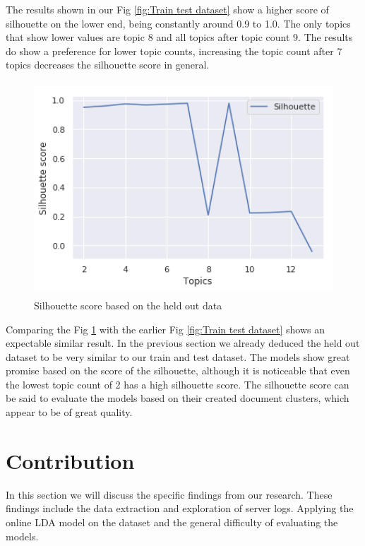 The results shown in our Fig \ref{fig:Train test dataset} show a higher score of silhouette on the lower end, being constantly around 0.9 to 1.0. The only topics that show lower values are topic 8 and all topics after topic count 9. The results do show a preference for lower topic counts, increasing the topic count after 7 topics decreases the silhouette score in general. 

\begin{figure}[h]
    \centering
    \includegraphics[width=15cm, height=8cm]{figures/silhouette_values_topics_held_out.png}
    \caption{Silhouette score based on the held out data}
    \label{fig:Held out}
\end{figure}

Comparing the Fig \ref{fig:Held out} with the earlier Fig \ref{fig:Train test dataset} shows an expectable similar result. In the previous section we already deduced the held out dataset to be very similar to our train and test dataset. The models show great promise based on the score of the silhouette, although it is noticeable that even the lowest topic count of 2 has a high silhouette score. The silhouette score can be said to evaluate the models based on their created document clusters, which appear to be of great quality. 

\FloatBarrier
\section{Contribution}\label{results:contribution}
In this section we will discuss the specific findings from our research. These findings include the data extraction and exploration of server logs. Applying the online LDA model on the dataset and the general difficulty of evaluating the models. 

